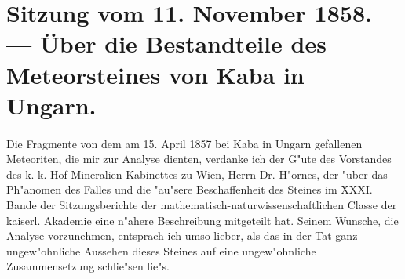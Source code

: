 \documentclass[a4paper, 11pt, oneside]{article}
\begin{document}
\section{Sitzung vom 11. November 1858. --- Über die Bestandteile des Meteorsteines von Kaba in Ungarn.}
\paragraph{}
Die Fragmente von dem am 15. April 1857 bei Kaba in Ungarn gefallenen Meteoriten, die mir zur Analyse dienten, verdanke ich der G"ute des Vorstandes des k. k. Hof-Mineralien-Kabinettes zu Wien, Herrn Dr. H"ornes, der "uber das Ph"anomen des Falles und die "au"sere Beschaffenheit des Steines im XXXI. Bande der Sitzungsberichte der mathematisch-naturwissenschaftlichen Classe der kaiserl. Akademie eine n"ahere Beschreibung mitgeteilt hat. Seinem Wunsche, die Analyse vorzunehmen, entsprach ich umso lieber, als das in der Tat ganz ungew"ohnliche Aussehen dieses Steines auf eine ungew"ohnliche Zusammensetzung schlie"sen lie"s.
\end{document}
